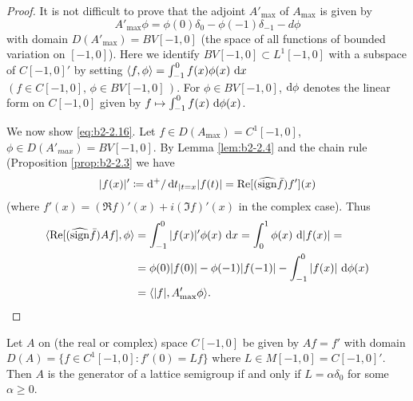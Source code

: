 \begin{proof}
It is not difficult to prove that the adjoint $A'_{\max}$ of $A_{\max}$ is given by
\begin{equation}\label{eq:b2-2.17}
A'_{\max}\phi = \phi(0)\delta_{0} - \phi(-1)\delta_{-1} - d\phi
\end{equation}
with domain $D(A'_{\max}) = BV[-1,0]$ (the space of all functions of bounded variation on $[-1,0]$).
Here we identify $BV[-1,0] \subset L^{1}[-1,0]$ with a subspace of $C[-1,0]'$ by setting $\langle f,\phi \rangle = \int_{-1}^{0} f(x)\phi(x)\,\mathop{}\!\mathrm{d}{x}$\, $(f \in C[-1,0], \,\phi \in BV[-1,0]\,)$.
For $\phi \in BV[-1,0]$,  $\mathop{}\!\mathrm{d}{\phi}$ denotes the linear form on $C[-1,0]$ given by $f \mapsto \int_{-1}^{0} f(x)\, \mathop{}\!\mathrm{d}{\phi(x)}$.

We now show \eqref{eq:b2-2.16}.
Let $f \in D(A_{\max}) = C^{1}[-1,0]$, $\phi \in D(A'_{max}) =  BV[-1,0]$.
By Lemma \ref{lem:b2-2.4} and the chain rule (Proposition \ref{prop:b2-2.3} we have
\[
|f(x)|' \coloneqq \mathop{}\!\mathrm{d}{^{+}}/\mathop{}\!\mathrm{d}{t}_{|t=x}|f(t)| = \mathop{}\!\mathrm{Re}[(\widehat{\operatorname{sign}} \bar{f})f'](x)
\]
(where $f'(x) = (\Re f)'(x) + i(\Im f)'(x)$ in the complex case).
Thus
\begin{align*}
\langle \mathop{}\!\mathrm{Re}[(\widehat{\operatorname{sign}} \bar{f})Af],\phi \rangle &= \int_{-1}^{0} |f(x)|'\phi(x)\, \mathop{}\!\mathrm{d}{x} = \int_{0}^{1} \phi(x)\, \mathop{}\!\mathrm{d}{|f(x)|} = \\
&= \phi(0)|f(0)| - \phi(-1)|f(-1)| - \int_{-1}^{0} |f(x)|\,\mathop{}\!\mathrm{d}{\phi(x)}  \\
&= \langle |f|,A'_{\max}\phi \rangle.
\end{align*}
\end{proof}
\begin{example}\label{ex:b2-2.13}
Let $A$ on (the real or complex) space $C[-1,0]$ be given by $Af = f'$ with domain $D(A) = \{f \in C^{1}[-1,0] \colon f'(0) = Lf\}$ where $L \in M[-1,0] = C[-1,0]'$.
Then $A$ is the generator of a lattice semigroup if and only if $L = \alpha\delta_{0}$ for some $\alpha \geq 0$.
\end{example}
